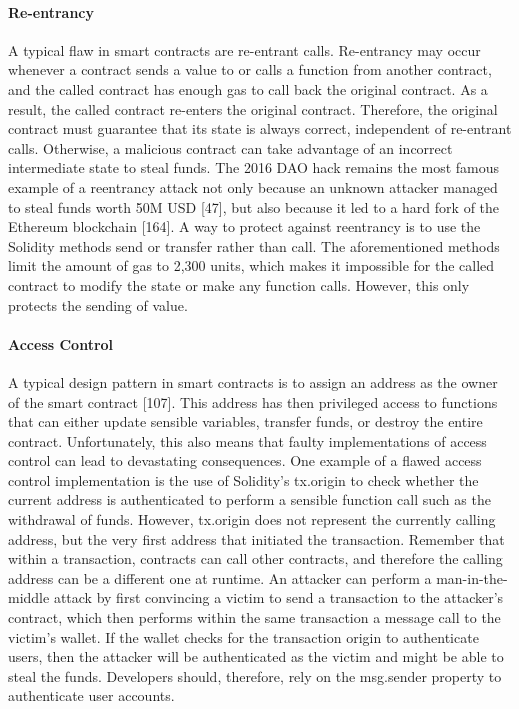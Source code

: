         \paragraph{Re-entrancy}
            A typical flaw in smart contracts are re-entrant calls.
            Re-entrancy may occur whenever a contract sends a value to or calls a function from another contract, and the called contract has enough gas to call back the original contract.
            As a result, the called contract re-enters the original contract.
            Therefore, the original contract must guarantee that its state is always correct, independent of re-entrant calls.
            Otherwise, a malicious contract can take advantage of an incorrect intermediate state to steal funds.
            The 2016 DAO hack remains the most famous example of a reentrancy attack not only because an unknown attacker managed to steal funds worth 50M USD [47], but also because it led to a hard fork of the Ethereum blockchain [164].
            A way to protect against reentrancy is to use the Solidity methods send or transfer rather than call.
            The aforementioned methods limit the amount of gas to 2,300 units, which makes it impossible for the called contract to modify the state or make any function calls.
            However, this only protects the sending of value.

        \paragraph{Access Control}
            A typical design pattern in smart contracts is to assign an address as the owner of the smart contract [107].
            This address has then privileged access to functions that can either update sensible variables, transfer funds, or destroy the entire contract.
            Unfortunately, this also means that faulty implementations of access control can lead to devastating consequences. One example of a flawed access control implementation is the use of Solidity's tx.origin to check whether the current address is authenticated to perform a sensible function call such as the withdrawal of funds.
            However, tx.origin does not represent the currently calling address, but the very first address that initiated the transaction.
            Remember that within a transaction, contracts can call other contracts, and therefore the calling address can be a different one at runtime.
            An attacker can perform a man-in-the-middle attack by first convincing a victim to send a transaction to the attacker's contract, which then performs within the same transaction a message call to the victim's wallet.
            If the wallet checks for the transaction origin to authenticate users, then the attacker will be authenticated as the victim and might be able to steal the funds.
            Developers should, therefore, rely on the msg.sender property to authenticate user accounts.

